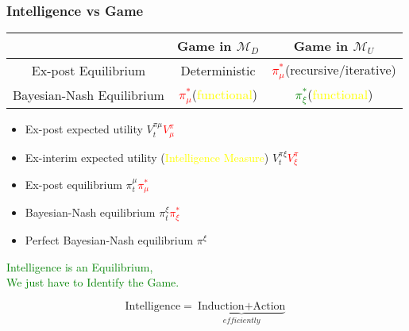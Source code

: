 \documentclass[UTF8,11pt,colorlinks,compress,openany]{beamer}%
\begin{document}
\begin{frame}\frametitle{Intelligence vs Game}
	\begin{table}[H]
		\begin{center}
			\begin{minipage}{70ex}
					\centering\begin{tabu}{c|c|c}
					\hline
						&Game in $\mathcal{M}_D$ &Game in $\mathcal{M}_U$\\
						\hline
						Ex-post Equilibrium &Deterministic &\textcolor{red}{$\pi_\mu^*$}(recursive/iterative)\\
						\hline
						Bayesian-Nash Equilibrium & \textcolor{red}{$\pi_\mu^*$}(\textcolor{yellow}{functional}) &\textcolor{green}{$\pi_\xi^*$}(\textcolor{yellow}{functional})\\
					\hline
					\end{tabu}
			\end{minipage}
		\end{center}
	\end{table}
	\begin{center}
		\begin{minipage}{.87\textwidth}
			\begin{itemize}
				\item Ex-post expected utility $V_t^{\pi\mu}$\hfill \textcolor{red}{$V_\mu^\pi$}
				\item Ex-interim expected utility (\textcolor{yellow}{Intelligence Measure}) $V_t^{\pi\xi}$\hfill \textcolor{red}{$V_\xi^\pi$}
				\item Ex-post equilibrium $\pi_t^\mu$\hfill \textcolor{red}{$\pi_\mu^*$}
				\item Bayesian-Nash equilibrium $\pi_t^\xi$\hfill \textcolor{red}{$\pi_\xi^*$}
				\item Perfect Bayesian-Nash equilibrium $\pi^\xi$
			\end{itemize}
		\end{minipage}
	\end{center}
	\begin{center}
		\textcolor{green}{\Large Intelligence is an Equilibrium,\\
			We just have to Identify the Game.}
	\end{center}
	\[\text{Intelligence}=\underbrace{\text{Induction}+\text{Action}}_{\textit{efficiently}}\]
\end{frame}
\end{document}
